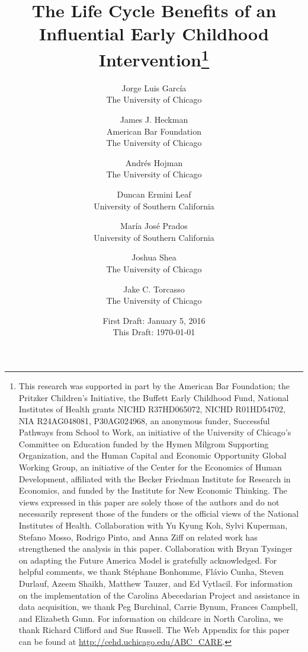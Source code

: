 






\begin{titlepage}

\title{\Large \textbf{The Life Cycle Benefits of an Influential Early Childhood Intervention}\thanks{This research was supported in part by the American Bar Foundation; the Pritzker Children's Initiative, the Buffett Early Childhood Fund, National Institutes of Health grants NICHD R37HD065072, NICHD R01HD54702, NIA R24AG048081, P30AG024968, an anonymous funder, Successful Pathways from School to Work, an initiative of the University of Chicago's Committee on Education funded by the Hymen Milgrom Supporting Organization, and the Human Capital and Economic Opportunity Global Working Group, an initiative of the Center for the Economics of Human Development, affiliated with the Becker Friedman Institute for Research in Economics, and funded by the Institute for New Economic Thinking. The views expressed in this paper are solely those of the authors and do not necessarily represent those of the funders or the official views of the National Institutes of Health. Collaboration with Yu Kyung Koh, Sylvi Kuperman, Stefano Mosso, Rodrigo Pinto, and Anna Ziff on related work has strengthened the analysis in this paper. Collaboration with Bryan Tysinger on adapting the Future America Model is gratefully acknowledged. For helpful comments, we thank St\'{e}phane Bonhomme, Fl\'{a}vio Cunha, Steven Durlauf, Azeem Shaikh, Matthew Tauzer, and Ed Vytlacil. For information on the implementation of the Carolina Abecedarian Project and assistance in data acquisition, we thank Peg Burchinal, Carrie Bynum, Frances Campbell, and Elizabeth Gunn. For information on childcare in North Carolina, we thank Richard Clifford and Sue Russell. The Web Appendix for this paper can be found at \url{http://cehd.uchicago.edu/ABC_CARE}.}}

\author{
Jorge Luis Garc\'{i}a\\
The University of Chicago \and
James J. Heckman \\
American Bar Foundation \\
The University of Chicago \and
Andr\'{e}s Hojman\\
The University of Chicago \and
Duncan Ermini Leaf \\
University of Southern California \and
Mar\'{i}a Jos\'{e} Prados \\
University of Southern California \and
Joshua Shea \\
The University of Chicago \and
Jake C. Torcasso\\
The University of Chicago}
\date{First Draft: January 5, 2016\\ This Draft: \today}

\maketitle

\end{titlepage}

